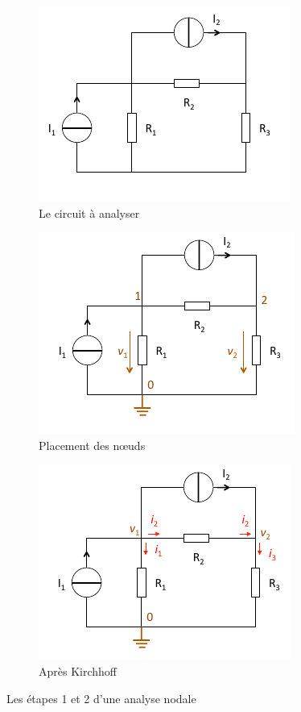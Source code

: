 \documentclass[12pt,a4paper]{article}
\begin{document}
\begin{figure}
	\centering
	\begin{subfigure}[b]{0.3\textwidth}
		\centering
		\includegraphics[scale=0.65]{images/nodale1}
		\caption{Le circuit à analyser}
		\label{subfig: nodale1}
	\end{subfigure}
	\begin{subfigure}[b]{0.3\textwidth}
		\centering
		\includegraphics[scale=0.65]{images/nodale2}
		\caption{Placement des n\oe uds}
		\label{subfig: nodale2}
	\end{subfigure}
	\begin{subfigure}[b]{0.3\textwidth}
		\centering
		\includegraphics[scale=0.65]{images/nodale3}
		\caption{Après Kirchhoff}
		\label{subfig: nodale3}
	\end{subfigure}
	\caption{Les étapes 1 et 2 d'une analyse nodale}
	\label{figs: analyse nodale}
\end{figure}
\end{document}

